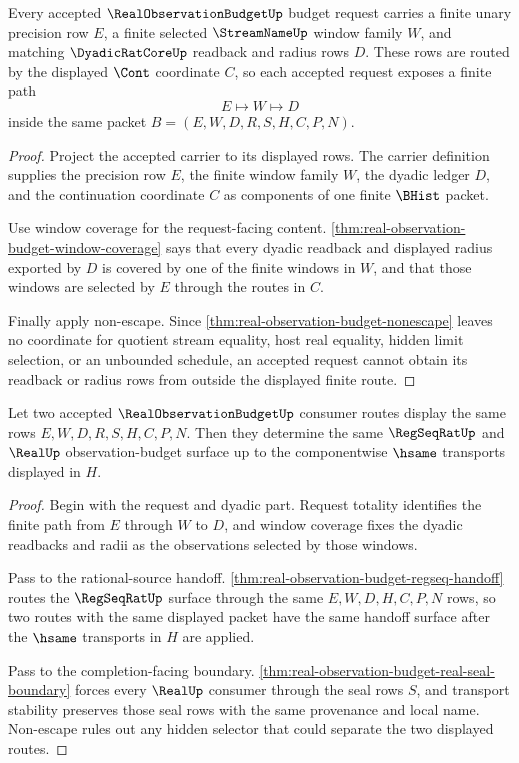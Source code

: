 \begin{theorem}
\label{thm:real-observation-budget-request-totality}
Every accepted $\RealObservationBudgetUp$ budget request carries a finite unary precision row $E$, a finite selected $\StreamNameUp$ window family $W$, and matching $\DyadicRatCoreUp$ readback and radius rows $D$. These rows are routed by the displayed $\Cont$ coordinate $C$, so each accepted request exposes a finite path
$$
E \longmapsto W \longmapsto D
$$
inside the same packet $B=(E,W,D,R,S,H,C,P,N)$.
\end{theorem}
\begin{proof}
Project the accepted carrier to its displayed rows. The carrier definition supplies the precision row $E$, the finite window family $W$, the dyadic ledger $D$, and the continuation coordinate $C$ as components of one finite $\BHist$ packet.

Use window coverage for the request-facing content. \autoref{thm:real-observation-budget-window-coverage} says that every dyadic readback and displayed radius exported by $D$ is covered by one of the finite windows in $W$, and that those windows are selected by $E$ through the routes in $C$.

Finally apply non-escape. Since \autoref{thm:real-observation-budget-nonescape} leaves no coordinate for quotient stream equality, host real equality, hidden limit selection, or an unbounded schedule, an accepted request cannot obtain its readback or radius rows from outside the displayed finite route.
\end{proof}

\begin{theorem}
\label{thm:real-observation-budget-route-determinacy}
Let two accepted $\RealObservationBudgetUp$ consumer routes display the same rows $E,W,D,R,S,H,C,P,N$. Then they determine the same $\RegSeqRatUp$ and $\RealUp$ observation-budget surface up to the componentwise $\hsame$ transports displayed in $H$.
\end{theorem}
\begin{proof}
Begin with the request and dyadic part. Request totality identifies the finite path from $E$ through $W$ to $D$, and window coverage fixes the dyadic readbacks and radii as the observations selected by those windows.

Pass to the rational-source handoff. \autoref{thm:real-observation-budget-regseq-handoff} routes the $\RegSeqRatUp$ surface through the same $E,W,D,H,C,P,N$ rows, so two routes with the same displayed packet have the same handoff surface after the $\hsame$ transports in $H$ are applied.

Pass to the completion-facing boundary. \autoref{thm:real-observation-budget-real-seal-boundary} forces every $\RealUp$ consumer through the seal rows $S$, and transport stability preserves those seal rows with the same provenance and local name. Non-escape rules out any hidden selector that could separate the two displayed routes.
\end{proof}

